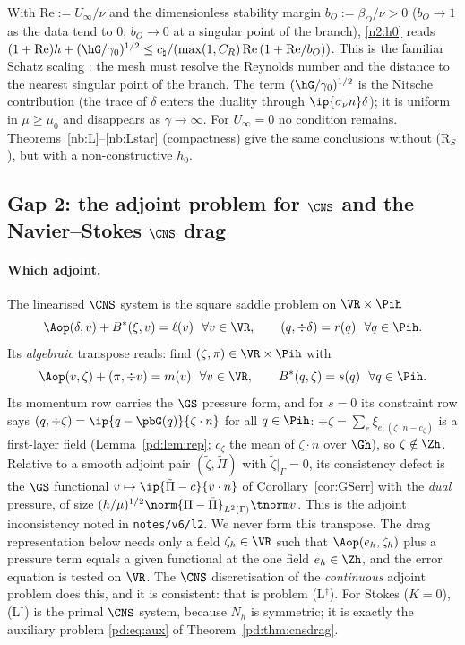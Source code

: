 \begin{remark}[Size of $h_0$]\label{n2:rem:h0}
With $\mathrm{Re}:=U_\infty/\nu$ and the dimensionless stability margin $b_O:=\beta_O/\nu>0$ ($b_O\to1$ as the data tend to $0$; $b_O\to0$ at a
singular point of the branch), \eqref{n2:h0} reads $(1+\mathrm{Re})h+(\hG/\gamma_0)^{1/2}\le c_\natural/(\max(1,C_R)\,\mathrm{Re}\,(1+\mathrm{Re}/b_O))$. This is the
familiar Schatz scaling \cite{Schatz1974}: the mesh must resolve the Reynolds number and the distance to the nearest singular point of the
branch. The term $(\hG/\gamma_0)^{1/2}$ is the Nitsche contribution (the trace of $\delta$ enters the duality through $\ip{\sigma_\nu n}\delta$);
it is uniform in $\mu\ge\mu_0$ and disappears as $\gamma\to\infty$. For $U_\infty=0$ no condition remains. Theorems~\ref{nb:L}--\ref{nb:Lstar}
(compactness) give the same conclusions without (R$_S$), but with a non-constructive $h_0$.
\end{remark}

\subsection{Gap 2: the adjoint problem for $\CNS$ and the Navier--Stokes $\CNS$ drag}\label{n2:adj}

\paragraph{Which adjoint.} The linearised $\CNS$ system is the square saddle problem on $\VR\times\Pih$
\[
\Aop(\delta,v)+B^\ast(\xi,v)=\ell(v)\ \ \forall v\in\VR,\qquad (q,\div\delta)=r(q)\ \ \forall q\in\Pih .
\]
Its \emph{algebraic} transpose reads: find $(\zeta,\pi)\in\VR\times\Pih$ with
\[
\Aop(v,\zeta)+(\pi,\div v)=m(v)\ \ \forall v\in\VR,\qquad B^\ast(q,\zeta)=s(q)\ \ \forall q\in\Pih .
\]
Its momentum row carries the $\GS$ pressure form, and for $s=0$ its constraint row says $(q,\div\zeta)=\ip{q-\pbG(q)}{\zeta\cdot n}$ for all
$q\in\Pih$: $\div\zeta=\sum_e\xi_{e,(\zeta\cdot n-c_\zeta)}$ is a first-layer field (Lemma~\ref{pd:lem:rep}; $c_\zeta$ the mean of $\zeta\cdot n$ over
$\Gh$), so $\zeta\notin\Zh$. Relative to a smooth adjoint pair $(\tilde\zeta,\tilde\Pi)$ with $\tilde\zeta|_\Gamma=0$, its consistency defect is
the $\GS$ functional $v\mapsto\ip{\tilde\Pi-c}{v\cdot n}$ of Corollary~\ref{cor:GSerr} with the \emph{dual} pressure, of size
$(h/\mu)^{1/2}\norm{\Pi-\bar\Pi}_{L^2(\Gamma)}\tnorm v$. This is the adjoint inconsistency noted in \texttt{notes/v6/l2}. We never form this
transpose. The drag representation below needs only a field $\zeta_h\in\VR$ such that $\Aop(e_h,\zeta_h)$ plus a pressure term equals a given
functional at the one field $e_h\in\Zh$, and the error equation is tested on $\VR$. The $\CNS$ discretisation of the \emph{continuous}
adjoint problem does this, and it is consistent: that is problem (L$^\dagger$). For Stokes ($K=0$), (L$^\dagger$) is the primal $\CNS$
system, because $N_h$ is symmetric; it is exactly the auxiliary problem \eqref{pd:eq:aux} of Theorem~\ref{pd:thm:cnsdrag}.

